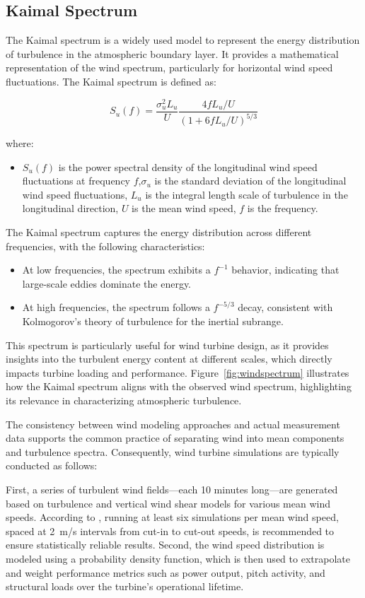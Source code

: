 \subsection{Kaimal Spectrum}
The Kaimal spectrum is a widely used model to represent the energy distribution of turbulence in the atmospheric boundary layer. It provides a mathematical representation of the wind spectrum, particularly for horizontal wind speed fluctuations. The Kaimal spectrum is defined as:

\begin{equation}
S_u(f) = \frac{\sigma_u^2 L_u}{U} \frac{4fL_u/U}{\left(1 + 6fL_u/U\right)^{5/3}}
\end{equation}

where:
\begin{itemize}
    \item $S_u(f)$ is the power spectral density of the longitudinal wind speed fluctuations at frequency $f$,$\sigma_u$ is the standard deviation of the longitudinal wind speed fluctuations, $L_u$ is the integral length scale of turbulence in the longitudinal direction, $U$ is the mean wind speed, $f$ is the frequency.
\end{itemize}

The Kaimal spectrum captures the energy distribution across different frequencies, with the following characteristics:
\begin{itemize}
    \item At low frequencies, the spectrum exhibits a $f^{-1}$ behavior, indicating that large-scale eddies dominate the energy.
    \item At high frequencies, the spectrum follows a $f^{-5/3}$ decay, consistent with Kolmogorov's theory of turbulence for the inertial subrange.
\end{itemize}

This spectrum is particularly useful for wind turbine design, as it provides insights into the turbulent energy content at different scales, which directly impacts turbine loading and performance. Figure~\ref{fig:windspectrum} illustrates how the Kaimal spectrum aligns with the observed wind spectrum, highlighting its relevance in characterizing atmospheric turbulence.

The consistency between wind modeling approaches and actual measurement data supports the common practice of separating wind into mean components and turbulence spectra. Consequently, wind turbine simulations are typically conducted as follows: 

First, a series of turbulent wind fields—each 10 minutes long—are generated based on turbulence and vertical wind shear models for various mean wind speeds. According to \cite{iec61400}, running at least six simulations per mean wind speed, spaced at 2~m/s intervals from cut-in to cut-out speeds, is recommended to ensure statistically reliable results. Second, the wind speed distribution is modeled using a probability density function, which is then used to extrapolate and weight performance metrics such as power output, pitch activity, and structural loads over the turbine's operational lifetime.

